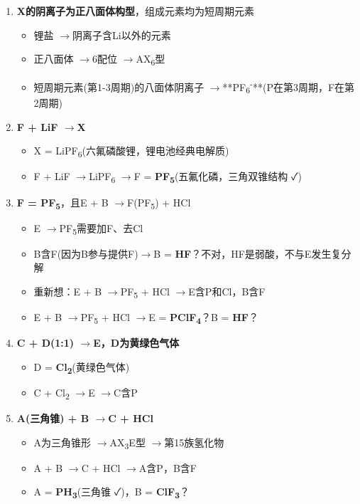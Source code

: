 \documentclass[a4paper,11pt]{ctexart}
\providecommand{\tightlist}{\setlength{\itemsep}{0pt}\setlength{\parskip}{0pt}}
\newcommand{\箭}{\ensuremath{\rightarrow}}
\newcommand{\左箭}{\ensuremath{\leftarrow}}
\newcommand{\上箭}{\ensuremath{\uparrow}}
\newcommand{\下箭}{\ensuremath{\downarrow}}
\newcommand{\衡}{\ensuremath{\rightleftharpoons}}
\newcommand{\双箭}{\ensuremath{\leftrightarrow}}
\newcommand{\约等于}{\ensuremath{\approx}}
\newcommand{\小于等于}{\ensuremath{\leq}}
\newcommand{\大于等于}{\ensuremath{\geq}}
\newcommand{\不等于}{\ensuremath{\neq}}
\newcommand{\西格马}{\ensuremath{\sigma}}
\newcommand{\派}{\ensuremath{\pi}}
\begin{document}
\begin{enumerate}
\def\labelenumi{\arabic{enumi}.}
\tightlist
\item
  \textbf{X的阴离子为正八面体构型}，组成元素均为短周期元素

  \begin{itemize}
  \tightlist
  \item
    锂盐 \箭 阴离子含Li以外的元素
  \item
    正八面体 \箭 6配位 \箭 AX\textsubscript{6}型
  \item
    短周期元素(第1-3周期)的八面体阴离子 \箭 **PF\textsubscript{6}\textsuperscript{-}**(P在第3周期，F在第2周期)
  \end{itemize}
\item
  \textbf{F + LiF \箭 X}

  \begin{itemize}
  \tightlist
  \item
    X = LiPF\textsubscript{6}(六氟磷酸锂，锂电池经典电解质)
  \item
    F + LiF \箭 LiPF\textsubscript{6} \箭 F = \textbf{PF\textsubscript{5}}(五氟化磷，三角双锥结构 ✓)
  \end{itemize}
\item
  \textbf{F = PF\textsubscript{5}}，且E + B \箭 F(PF\textsubscript{5}) + HCl

  \begin{itemize}
  \tightlist
  \item
    E \箭 PF\textsubscript{5}需要加F、去Cl
  \item
    B含F(因为B参与提供F)\箭 B = \textbf{HF}？不对，HF是弱酸，不与E发生复分解
  \item
    重新想：E + B \箭 PF\textsubscript{5} + HCl \箭 E含P和Cl，B含F
  \item
    E + B \箭 PF\textsubscript{5} + HCl \箭 E = \textbf{PClF\textsubscript{4}}？B = \textbf{HF}？
  \end{itemize}
\item
  \textbf{C + D(1:1) \箭 E，D为黄绿色气体}

  \begin{itemize}
  \tightlist
  \item
    D = \textbf{Cl\textsubscript{2}}(黄绿色气体)
  \item
    C + Cl\textsubscript{2} \箭 E \箭 C含P
  \end{itemize}
\item
  \textbf{A(三角锥) + B \箭 C + HCl}

  \begin{itemize}
  \tightlist
  \item
    A为三角锥形 \箭 AX\textsubscript{3}E型 \箭 第15族氢化物
  \item
    A + B \箭 C + HCl \箭 A含P，B含F
  \item
    A = \textbf{PH\textsubscript{3}}(三角锥 ✓)，B = \textbf{ClF\textsubscript{3}}？
  \end{itemize}
\end{enumerate}
\end{document}
